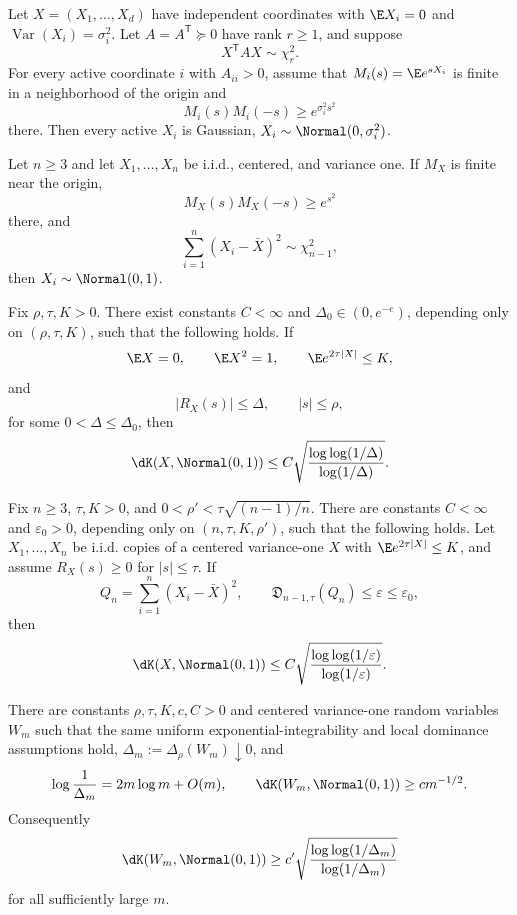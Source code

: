 \begin{theorem}\label{thm:exact-psd}
Let $X=(X_1,\ldots,X_d)$ have independent coordinates with $\E X_i=0$ and $\operatorname{Var}(X_i)=\sigma_i^2$. Let $A=A^{\mathsf T}\succeq0$ have rank $r\ge1$, and suppose
\[
X^{\mathsf T}AX\sim\chi_r^2.
\]
For every active coordinate $i$ with $A_{ii}>0$, assume that $M_i(s)=\E e^{sX_i}$ is finite in a neighborhood of the origin and
\[
M_i(s)M_i(-s)\ge e^{\sigma_i^2s^2}
\]
there. Then every active $X_i$ is Gaussian, $X_i\sim\Normal(0,\sigma_i^2)$.
\end{theorem}

\begin{corollary}\label{cor:exact-sample-var}
Let $n\ge3$ and let $X_1,\ldots,X_n$ be i.i.d., centered, and variance one. If $M_X$ is finite near the origin,
\[
M_X(s)M_X(-s)\ge e^{s^2}
\]
there, and
\[
\sum_{i=1}^n(X_i-\bar X)^2\sim\chi^2_{n-1},
\]
then $X_i\sim\Normal(0,1)$.
\end{corollary}

\begin{theorem}\label{thm:sharp-upper}
Fix $\rho,\tau,K>0$. There exist constants $C<\infty$ and $\Delta_0\in(0,e^{-e})$, depending only on $(\rho,\tau,K)$, such that the following holds. If
\[
\E X=0,\qquad \E X^2=1,\qquad \E e^{2\tau|X|}\le K,
\]
and
\[
|R_X(s)|\le\Delta,
\qquad |s|\le\rho,
\]
for some $0<\Delta\le\Delta_0$, then
\[
\dK(X,\Normal(0,1))
\le C\sqrt{\frac{\log\log(1/\Delta)}{\log(1/\Delta)}}.
\]
\end{theorem}

\begin{theorem}\label{thm:sample-var}
Fix $n\ge3$, $\tau,K>0$, and $0<\rho'<\tau\sqrt{(n-1)/n}$. There are constants $C<\infty$ and $\varepsilon_0>0$, depending only on $(n,\tau,K,\rho')$, such that the following holds. Let $X_1,\ldots,X_n$ be i.i.d. copies of a centered variance-one $X$ with $\E e^{2\tau|X|}\le K$, and assume $R_X(s)\ge0$ for $|s|\le\tau$. If
\[
Q_n=\sum_{i=1}^n(X_i-\bar X)^2,
\qquad
\mathfrak D_{n-1,\tau}(Q_n)\le\varepsilon\le\varepsilon_0,
\]
then
\[
\dK(X,\Normal(0,1))
\le C\sqrt{\frac{\log\log(1/\varepsilon)}{\log(1/\varepsilon)}}.
\]
\end{theorem}

\begin{theorem}\label{thm:sharpness}
There are constants $\rho,\tau,K,c,C>0$ and centered variance-one random variables $W_m$ such that the same uniform exponential-integrability and local dominance assumptions hold, $\Delta_m:=\Delta_\rho(W_m)\downarrow0$, and
\[
\log\frac1{\Delta_m}=2m\log m+O(m),
\qquad
\dK(W_m,\Normal(0,1))\ge c m^{-1/2}.
\]
Consequently
\[
\dK(W_m,\Normal(0,1))
\ge c'\sqrt{\frac{\log\log(1/\Delta_m)}{\log(1/\Delta_m)}}
\]
for all sufficiently large $m$.
\end{theorem}

